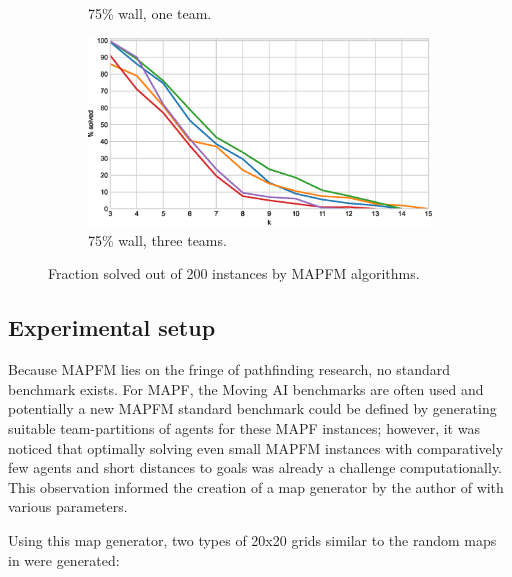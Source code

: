 \documentclass[english]{article}
\newcommand\graphwidth{0.49\textwidth}
\begin{document}
\begin{figure}[b]
\begin{subfigure}{\graphwidth}
			\caption{75\% wall, one team.}
			\label{fig:r-75-1-p}
		\end{subfigure}
		\begin{subfigure}{\graphwidth}
			\centering
			\includegraphics[width=\linewidth]{img/results/relative-comparison/75-3-p}
			\caption{75\% wall, three teams.}
			\label{fig:r-75-3-p}
		\end{subfigure}
		\caption{Fraction solved out of 200 instances by MAPFM algorithms.}
		\label{fig:r-probs}
	\end{figure}
	
	\restoregeometry
	\subsection{Experimental setup}
	Because MAPFM lies on the fringe of pathfinding research, no standard benchmark exists. For MAPF, the Moving AI benchmarks \cite{sturtevant2012} are often used and potentially a new MAPFM standard benchmark could be defined by generating suitable team-partitions of agents for these MAPF instances; however, it was noticed that optimally solving even small MAPFM instances with comparatively few agents and short distances to goals was already a challenge computationally. This observation informed the creation of a map generator by the author of \cite{bruin2021} with various parameters. 
	
	
	Using this map generator, two types of 20x20 grids similar to the random maps in \cite{sturtevant2012} were generated:
	
\end{document}
